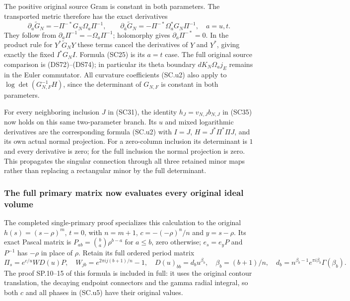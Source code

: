 The positive original source Gram is constant in both parameters.
The transported metric therefore has the exact derivatives
\[
 \partial_a\widetilde G_N
       =-\Pi^{-*}G_N\Omega_a\Pi^{-1},\qquad
 \partial_{\bar a}\widetilde G_N
       =-\Pi^{-*}\Omega_a^*G_N\Pi^{-1},\quad a=u,t.
 \tag{SC.u4}
\]
They follow from $\partial_a\Pi^{-1}=-\Omega_a\Pi^{-1}$;
holomorphy gives $\partial_a\Pi^{-*}=0$.
In the product rule for $Y^*\widetilde G_NY$ these terms
cancel the derivatives of $Y$ and $Y^*$, giving exactly the
fixed $I^*G_NI$.  Formula (SC25) is its $a=t$ case.
The full original source comparison is (DS72)--(DS74);
in particular its theta boundary $dK_N\Omega_a j_E$ remains
in the Euler commutator.  All curvature coefficients (SC.u2)
also apply to $\log\det(G_{N,F}^{-1}H)$, since the determinant
of $G_{N,F}$ is constant in both parameters.

For every neighboring inclusion $J$ in (SC31), the identity
$h_J=v_{N,J}b_{N,J}$ in (SC35) now holds on this same
two-parameter branch.  Its $u$ and mixed logarithmic
derivatives are the corresponding formula (SC.u2) with
$I=J$, $H=J^*\Pi^*\Pi J$, and its own actual normal
projection.  For a zero-column inclusion its determinant is
$1$ and every derivative is zero; for the full inclusion the
normal projection is zero.  This propagates the singular
connection through all three retained minor maps rather than
replacing a rectangular minor by the full determinant.

\subsubsection{The full primary matrix now evaluates every original ideal volume}
The completed single-primary proof specializes this calculation
to the original $h(s)=(s-\rho)^m$, $t=0$, with $n=m+1$,
$c=-(-\rho)^n/n$ and $y=s-\rho$.  Its exact Pascal matrix
is $P_{ab}=\binom ba\rho^{b-a}$ for $a\le b$, zero otherwise;
$e_s=e_yP$ and $P^{-1}$ has $-\rho$ in place of $\rho$.
Retain its full ordered period matrix
\[
 \Pi_s=e^{c/u}WD(u)P,\quad
 W_{jb}=e^{2\pi i j(b+1)/n}-1,\quad
 D(u)_{bb}=d_bu^{\beta_b},\quad
 \beta_b=(b+1)/n,\quad
 d_b=n^{\beta_b-1}e^{\pi i\beta_b}\Gamma(\beta_b).
 \tag{SC.u5}
\]
The proof SP.10--15 of this formula is included in full: it
uses the original contour translation, the decaying endpoint
connectors and the gamma radial integral, so both $c$ and all
phases in (SC.u5) have their original values.

